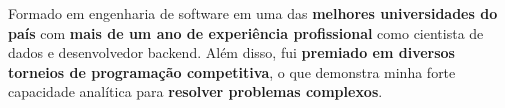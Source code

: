 \documentclass[a4paper,12pt]{article}
\begin{document}

Formado em engenharia de software em uma das \textbf{melhores universidades do país}
com \textbf{mais de um ano de experiência profissional} como cientista de dados e desenvolvedor backend.
Além disso, fui \textbf{premiado em diversos torneios de programação competitiva}, o que demonstra minha forte
capacidade analítica para \textbf{resolver problemas complexos}.
\end{document}
